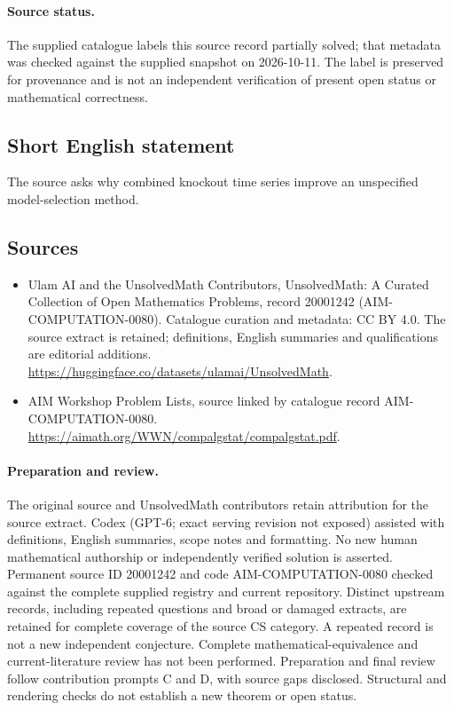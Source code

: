\documentclass[11pt]{article}
\begin{document}
\paragraph{Source status.}
The supplied catalogue labels this source record partially solved; that metadata was checked against the supplied snapshot on 2026-10-11. The label is preserved for provenance and is not an independent verification of present open status or mathematical correctness.
\subsection{Short English statement}
The source asks why combined knockout time series improve an unspecified model-selection method.
\subsection{Sources}
\begin{itemize}
\item[\hypertarget{source:20001242:1}{S1}] Ulam AI and the UnsolvedMath Contributors, UnsolvedMath: A Curated Collection of Open Mathematics Problems, record 20001242 (AIM-COMPUTATION-0080). Catalogue curation and metadata: CC BY 4.0. The source extract is retained; definitions, English summaries and qualifications are editorial additions.
\url{https://huggingface.co/datasets/ulamai/UnsolvedMath}.
\item[\hypertarget{source:20001242:2}{S2}] AIM Workshop Problem Lists, source linked by catalogue record AIM-COMPUTATION-0080.
\url{https://aimath.org/WWN/compalgstat/compalgstat.pdf}.
\end{itemize}
\paragraph{Preparation and review.}
The original source and UnsolvedMath contributors retain attribution for the source extract. Codex (GPT-6; exact serving revision not exposed) assisted with definitions, English summaries, scope notes and formatting. No new human mathematical authorship or independently verified solution is asserted. Permanent source ID 20001242 and code AIM-COMPUTATION-0080 checked against the complete supplied registry and current repository. Distinct upstream records, including repeated questions and broad or damaged extracts, are retained for complete coverage of the source CS category. A repeated record is not a new independent conjecture. Complete mathematical-equivalence and current-literature review has not been performed. Preparation and final review follow contribution prompts C and D, with source gaps disclosed. Structural and rendering checks do not establish a new theorem or open status.
\label{end:20001242}
\end{document}
